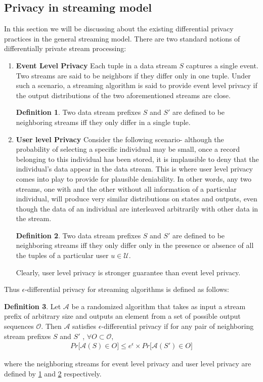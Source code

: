 \documentclass{article}
\theoremstyle{definition}
\newtheorem{definition}{Definition}[section]
\begin{document}
\subsection{Privacy in streaming model}
In this section we will be discussing about the existing differential privacy practices in the general streaming model. 
There are two standard notions of differentially private stream processing:
\begin{enumerate} \item \textbf{Event Level Privacy} Each tuple in a data stream $S$ captures a single event. Two streams are said to be neighbors if they differ only in one tuple. Under such a scenario, a streaming algorithm is said to provide event level privacy if the output distributions of the two aforementioned streams are close. %
\begin{definition} Two data stream prefixes $S$ and $S'$ are defined to be neighboring streams iff they only differ in a single tuple. \label{e}\end{definition}
 \item \textbf{User level Privacy} 
Consider the following scenario- although the probability of selecting a specific individual may be small, once a record belonging to this individual has been stored, it is implausible to deny that the individual's data appear in the data stream. This is where user level privacy comes into play to provide for plausible deniability. In other words, any two streams, one with and the other without all information of a particular individual, will produce very similar distributions on states and outputs, even though the data of an individual are interleaved arbitrarily with other data in the stream.
\begin{definition} Two data stream prefixes $S$ and $S'$ are defined to be neighboring streams iff they only differ only in the presence or absence
of all the tuples of a particular user $u \in \mathcal{U}$.\label{u}\end{definition}  Clearly, user level privacy is stronger guarantee than event level privacy.  \end{enumerate}  Thus $\epsilon$-differential privacy for streaming algorithms is defined as follows:
\begin{definition}Let $\mathcal{A}$ be a randomized
algorithm that takes as input a stream prefix of arbitrary size and
outputs an element from a set of possible output sequences $\mathcal{O}$. Then
$\mathcal{A}$ satisfies $\epsilon$-differential privacy if for any pair of neighboring
stream prefixes $S$ and $S'$
, $ \forall O \subset \mathcal{O}$,
\begin{gather}Pr\Big[ \mathcal{A}(S) \in O \Big]\leq e^{\epsilon} \times Pr\Big[\mathcal{A}(S') \in O\Big]\end{gather}
\end{definition} where the neighboring streams for event level privacy and user level privacy are defined  by \ref{e} and \ref{u} respectively.
\end{document}
